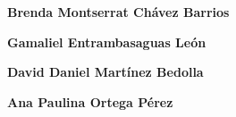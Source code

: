 \textbf{Brenda Montserrat Chávez Barrios}
\newline\newline

\textbf{Gamaliel Entrambasaguas León}
\newline\newline

\textbf{David Daniel Martínez Bedolla}
\newline\newline

\textbf{Ana Paulina Ortega Pérez}
\newline\newline


